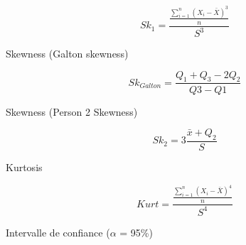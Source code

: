 \documentclass{article}
\begin{document}
\begin{equation}
    Sk_1 = \frac{\frac{\sum_{i=1}^{n}(X_i - \bar{X})^3}{n}}{S^3}
\end{equation}

Skewness (Galton skewness)

\begin{equation}
    Sk_{Galton} = \frac{Q_1 + Q_3 -2Q_2}{Q3-Q1}
\end{equation}

Skewness (Person 2 Skewness)

\begin{equation}
    Sk_2 = 3\frac{\bar{x} + Q_2}{S}
\end{equation}

Kurtosis

\begin{equation}
    Kurt = \frac{\frac{\sum_{i=1}^{n}(X_i - \bar{X})^4}{n}}{S^4}
\end{equation}


Intervalle de confiance ($\alpha$ = 95\%)

\begin{equation}
    [\bar{X} - 1.96 * \frac{S}{\sqrt{n}}, \bar{X} + 1.96 * \frac{S}{\sqrt{n}}]
\end{equation}
\end{document}
